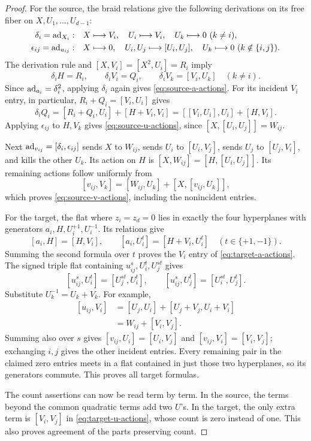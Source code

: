 \begin{proof}
For the source, the braid relations give the following derivations
on its free fiber on $X,U_1,\ldots,U_{d-1}$:
\[
 \begin{aligned}
 \delta_i=\operatorname{ad}_{X_i}:&\quad
 X\longmapsto V_i,\quad U_i\longmapsto V_i,\quad
 U_k\longmapsto0\ (k\ne i),\\
 \epsilon_{ij}=\operatorname{ad}_{u_{ij}}:&\quad
 X\longmapsto0,\quad U_i,U_j\longmapsto[U_i,U_j],\quad
 U_k\longmapsto0\ (k\notin\{i,j\}).
 \end{aligned}
\]
The derivation rule and $[X,V_i]=[X^2,U_i]=R_i$ imply
\[
 \delta_iH=R_i,\qquad \delta_iV_i=Q_i,\qquad
 \delta_iV_k=[V_i,U_k]\quad(k\ne i).
\]
Since $\operatorname{ad}_{a_i}=\delta_i^2$, applying $\delta_i$ again gives
\eqref{eq:source-a-actions}.  For its incident $V_i$ entry, in
particular, $R_i+Q_i=[V_i,U_i]$ gives
\[
 \delta_iQ_i=[R_i+Q_i,U_i]+[H+V_i,V_i]
 =[ [V_i,U_i],U_i]+[H,V_i].
\]
Applying $\epsilon_{ij}$ to $H,V_k$ gives
\eqref{eq:source-u-actions}, since
$[X,[U_i,U_j]]=W_{ij}$.

Next $\operatorname{ad}_{v_{ij}}=[\delta_i,\epsilon_{ij}]$ sends $X$ to $W_{ij}$,
sends $U_i$ to $[U_i,V_j]$, sends $U_j$ to $[U_j,V_i]$, and kills the
other $U_k$.  Its action on $H$ is
$[X,W_{ij}]=[H,[U_i,U_j]]$.  Its remaining actions follow uniformly
from
\[
 [v_{ij},V_k]=[W_{ij},U_k]+[X,[v_{ij},U_k]],
\]
which proves \eqref{eq:source-v-actions}, including the nonincident
entries.

For the target, the flat where $z_i=z_d=0$ lies in exactly the four
hyperplanes with generators $a_i,H,U_i^{+1},U_i^{-1}$.  Its relations give
\[
 [a_i,H]=[H,V_i],\qquad
 [a_i,U_i^t]=[H+V_i,U_i^t]\quad(t\in\{+1,-1\}).
\]
Summing the second formula over $t$ proves the $V_i$ entry of
\eqref{eq:target-a-actions}.  The signed triple flat containing
$u_{ij}^s,U_i^t,U_j^{st}$ gives
\[
 [u_{ij}^s,U_i^t]=[U_j^{st},U_i^t],\qquad
 [u_{ij}^s,U_j^t]=[U_i^{st},U_j^t].
\]
Substitute $U_k^{-1}=U_k+V_k$.  For example,
\[
 \begin{aligned}
 [u_{ij},V_i]
 &=[U_j,U_i]+[U_j+V_j,U_i+V_i]\\
 &=W_{ij}+[V_i,V_j].
 \end{aligned}
\]
Summing also over $s$ gives
$[v_{ij},U_i]=[U_i,V_j]$ and
$[v_{ij},V_i]=[V_i,V_j]$; exchanging $i,j$ gives the other incident
entries.  Every remaining pair in the claimed zero entries meets
in a flat contained in just those two hyperplanes, so its generators
commute.  This proves all target formulas.

The count assertions can now be read term by term.  In the source,
the terms beyond the common quadratic terms add two $U$'s.  In the
target, the only extra term is $[V_i,V_j]$ in
\eqref{eq:target-u-actions}, whose count is zero instead of one.
This also proves agreement of the parts preserving count.
\end{proof}

